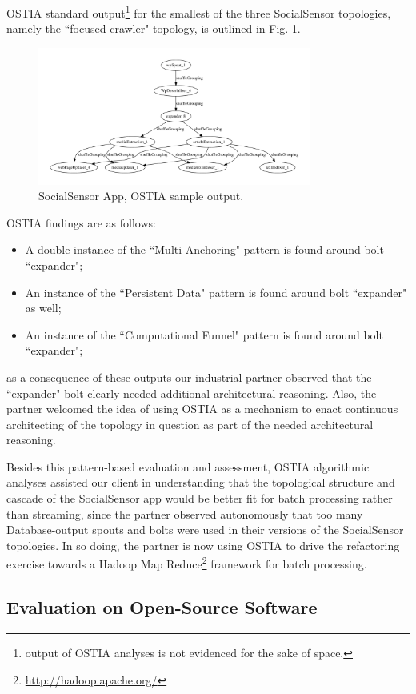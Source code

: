 OSTIA standard output\footnote{output of OSTIA analyses is not evidenced for the sake of space.} for the smallest of the three SocialSensor topologies, namely the ``focused-crawler" topology, is outlined in Fig. \ref{topo1}.

\begin{figure}[H]
		\includegraphics[width=9cm]{images/output/focused_crawler}
		\caption{SocialSensor App, OSTIA sample output.}
		\label{topo1}
\end{figure}

OSTIA findings are as follows:
\begin{itemize}
\item A double instance of the ``Multi-Anchoring" pattern is found around bolt ``expander";
\item An instance of the ``Persistent Data" pattern is found around bolt ``expander" as well;
\item An instance of the ``Computational Funnel" pattern is found around bolt ``expander";
\end{itemize}

as a consequence of these outputs our industrial partner observed that the ``expander" bolt clearly needed additional architectural reasoning. Also, the partner welcomed the idea of using OSTIA as a mechanism to enact continuous architecting of the topology in question as part of the needed architectural reasoning.

Besides this pattern-based evaluation and assessment, OSTIA algorithmic analyses assisted our client in understanding that the topological structure and cascade of the SocialSensor app would be better fit for batch processing rather than streaming, since the partner observed autonomously that too many Database-output spouts and bolts were used in their versions of the SocialSensor topologies. In so doing, the partner is now using OSTIA to drive the refactoring exercise towards a Hadoop Map Reduce\footnote{\url{http://hadoop.apache.org/}} framework for batch processing.

\subsection{Evaluation on Open-Source Software}\label{os}

